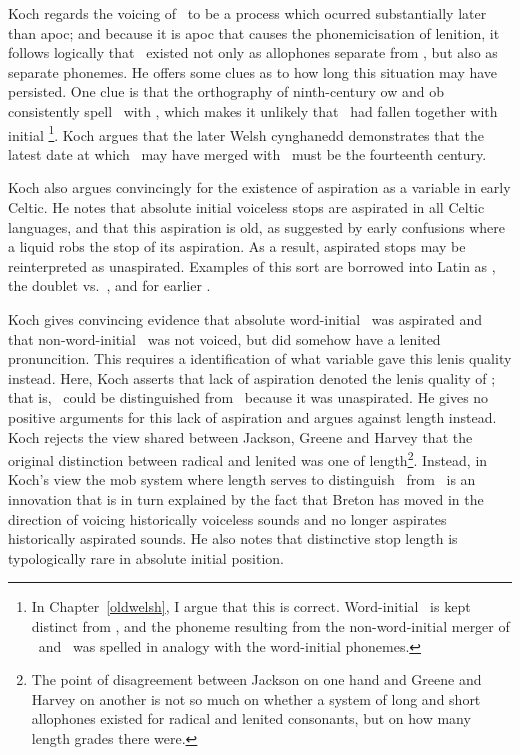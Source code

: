 Koch regards the voicing of \lT\ to be a process which ocurred substantially later than \gls{apoc}; and because it is \gls{apoc} that causes the phonemicisation of lenition, it follows logically that \lT\ existed not only as allophones separate from \xD, but also as separate \gls{phoneme}s. He offers some clues as to how long this situation may have persisted. One clue is that the orthography of ninth-century \gls{ow} and \gls{ob} consistently spell \lT\ with , which makes it unlikely that \lT\ had fallen together with initial \xD\footnote{In Chapter~\ref{oldwelsh}, I argue that this is correct. Word-initial \lT\ is kept distinct from \xD, and the phoneme resulting from the non-word-initial merger of \lT\ and \xD\ was spelled in analogy with the word-initial phonemes.}. Koch argues that the later Welsh cynghanedd demonstrates that the latest date at which \lT\ may have merged with \xD\ must be the fourteenth century. 

Koch also argues convincingly for the existence of aspiration as a variable in early Celtic. He notes that absolute initial voiceless stops are aspirated in all Celtic languages, and that this aspiration is old, as suggested by early confusions where a liquid robs the stop of its aspiration. As a result, aspirated stops may be reinterpreted as unaspirated. Examples of this sort are   borrowed into Latin as , the doublet  vs.~, and  for earlier .

Koch gives convincing evidence that absolute word-initial \xT\ was aspirated and that non-word-initial \lT\ was not voiced, but did somehow have a lenited pronuncition. This requires a identification of what variable gave  this lenis quality instead. Here, Koch asserts that lack of aspiration denoted the lenis quality of \lT; that is, \lT\ could be distinguished from \xT\ because it was unaspirated. He gives no positive arguments for this lack of aspiration and argues against length instead. Koch rejects the view shared between Jackson, Greene and Harvey that the original distinction between radical and lenited was one of length\footnote{The point of disagreement between Jackson on one hand and Greene and Harvey on another is not so much on whether a system of long and short allophones existed for radical and lenited consonants, but on how many length grades there were.}. Instead, in Koch's view the \gls{mob} system where length serves to distinguish \lT\ from \xD\ is an innovation that is in turn  explained by the fact that Breton has moved in the direction of voicing historically voiceless sounds and no longer aspirates historically aspirated sounds. He also notes that distinctive stop length is typologically rare in absolute initial position. 

